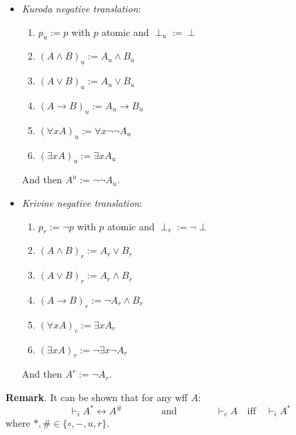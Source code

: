 \documentclass[12pt]{article}
\begin{document}
\begin{itemize}
\item \emph{Kuroda negative translation}:
\begin{multicols}{2}
\begin{enumerate}
\item $p_u:= p$ with $p$ atomic and $\perp_u:=\perp$
\item $(A\land  B)_u:=A_u\land B_u$
\item $(A\lor B)_u:=A_u \lor B_u$
\item $(A\to B)_u:=A_u\to B_u$
\item $(\forall x A)_u:=\forall x \neg\neg A_u$
\item $(\exists x A)_u:=\exists x A_u$
\end{enumerate}
\end{multicols}
And then $A^u:=\neg \neg A_u$.
\item \emph{Krivine negative translation}:
\begin{multicols}{2}
\begin{enumerate}
\item $p_r:= \neg p$ with $p$ atomic and $\perp_r:=\neg \perp$
\item $(A\land  B)_r:=A_r\lor B_r$
\item $(A\lor B)_r:=A_r \land B_r$
\item $(A\to B)_r:=\neg A_r\land B_r$
\item $(\forall x A)_r:=\exists x A_r$
\item $(\exists x A)_r:=\neg \exists x \neg A_r$
\end{enumerate}
\end{multicols}
And then $A^r:=\neg A_r$.
\end{itemize}

\textbf{Remark}.  It can be shown that for any wff $A$: $$\vdash_i A^* \leftrightarrow A^{\#}\qquad\qquad \mbox{and} \qquad\qquad \vdash_c A \quad \mbox{iff} \quad \vdash_i A^*$$ where $*,\# \in \lbrace \circ, -, u, r\rbrace$.

\end{document}
